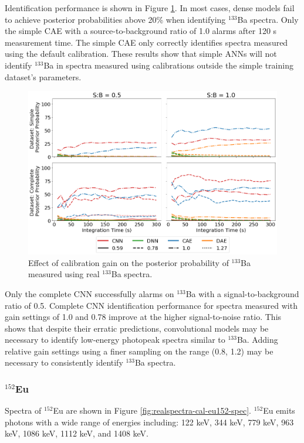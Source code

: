 Identification performance is shown in Figure \ref{fig:realspectra-cal-ba133}. In most cases, dense models fail to achieve posterior probabilities above 20\% when identifying $^{133}$Ba spectra. Only the simple CAE with a source-to-background ratio of 1.0 alarms after 120 s measurement time. The simple CAE only correctly identifies spectra measured using the default calibration. These results show that simple ANNs will not identify $^{133}$Ba in spectra measured using calibrations outside the simple training dataset's parameters. 

\begin{figure}[H]
	\centering
	\includegraphics[width=1.0\linewidth]{images/realspectra-cal-ba133}
	\caption{Effect of calibration gain on the posterior probability of $^{133}$Ba measured using real $^{133}$Ba spectra.}
	\label{fig:realspectra-cal-ba133}
\end{figure}

Only the complete CNN successfully alarms on $^{133}$Ba with a signal-to-background ratio of 0.5. Complete CNN identification performance for spectra measured with gain settings of 1.0 and 0.78 improve at the higher signal-to-noise ratio. This shows that despite their erratic predictions, convolutional models may be necessary to identify low-energy photopeak spectra similar to $^{133}$Ba. Adding relative gain settings using a finer sampling on the range (0.8, 1.2) may be necessary to consistently identify $^{133}$Ba spectra.


\subsubsection{$^{152}$Eu}

Spectra of $^{152}$Eu are shown in Figure \ref{fig:realspectra-cal-eu152-spec}. $^{152}$Eu emits photons with a wide range of energies including: 122 keV, 344 keV, 779 keV, 963 keV, 1086 keV, 1112 keV, and 1408 keV. 


